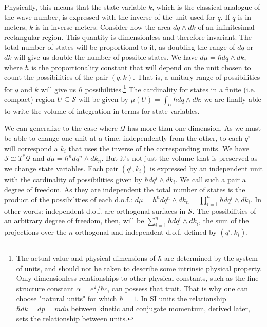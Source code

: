 \documentclass[aps,pra,10pt,twocolumn,floatfix,nofootinbib]{revtex4-1}
\numberwithin{equation}{section}
\theoremstyle{definition}
\begin{document}
Physically, this means that the state variable $k$, which is the classical analogue of the wave number, is expressed with the inverse of the unit used for $q$. If $q$ is in meters, $k$ is in inverse meters. Consider now the area $dq \wedge dk$ of an infinitesimal rectangular region. This quantity is dimensionless and therefore invariant. The total number of states will be proportional to it, as  doubling the range of $dq$ or $dk$ will give us double the number of possible states. We have $d\mu = \hbar dq \wedge dk$, where $\hbar$ is the proportionality constant that will depend on the unit chosen to count the possibilities of the pair $(q, k)$. That is, a unitary range of possibilities for $q$ and $k$ will give us $\hbar$ possibilities.\footnote{The actual value and physical dimensions of $\hbar$ are determined by the system of units, and should not be taken to describe some intrinsic physical property. Only dimensionless relationships to other physical constants, such as the fine structure constant $\alpha = e^2/\hbar c$, can possess that trait. That is why one can choose "natural units" for which $\hbar=1$. In SI units the relationship $\hbar dk = dp = m du$ between kinetic and conjugate momentum, derived later, sets the relationship between units.} The cardinality for states in a finite (i.e. compact) region $U \subseteq \mathcal{S}$ will be given by $\mu(U) = \int_U \hbar dq \wedge dk$: we are finally able to write the volume of integration in terms for state variables.

We can generalize to the case where $\mathcal{Q}$ has more than one dimension. As we must be able to change one unit at a time, independently from the other, to each $q^i$ will correspond a $k_i$ that uses the inverse of the corresponding units. We have $\mathcal{S}\cong T^*\mathcal{Q}$ and $d\mu = \hbar^n dq^n \wedge dk_n$. But it's not just the volume that is preserved as we change state variables. Each pair $(q^i, k_i)$ is expressed by an independent unit with the cardinality of possibilities given by $\hbar dq^i \wedge dk_i$. We call such a pair a degree of freedom. As they are independent the total number of states is the product of the possibilities of each d.o.f.: $d\mu = \hbar^n dq^n \wedge dk_n = \prod \limits_{i=1}^n \hbar dq^i \wedge dk_i$. In other words: independent d.o.f. are orthogonal surfaces in $\mathcal{S}$. The possibilities of an arbitrary degree of freedom, then, will be $\sum \limits_{i=1}^n \hbar dq^i \wedge dk_i$, the sum of the projections over the $n$ orthogonal and independent d.o.f. defined by $(q^i, k_i)$.
\end{document}
